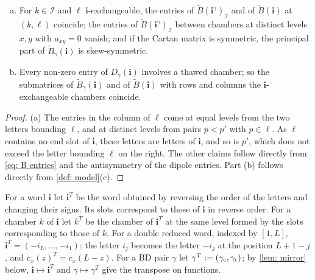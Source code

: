 \documentclass[a4paper]{amsart}
\numberwithin{equation}{section}
\theoremstyle{definition}
\theoremstyle{remark}
\newcommand{\mcI}{\mathcal{I}}
\newcommand{\bfi}{\mathbf{i}}
\newcommand{\tB}{\widetilde{B}}
\newcommand{\rr}{{\rm r}}
\newcommand{\cc}{{\rm c}}
\begin{document}
\begin{lemma}
  \label{lem: model local}
  \begin{enumerate}[(a)]
    \item For $k\in\mcI$ and $\ell$ $\bfi$-exchangeable, the entries of $\tB(\bfi^\gamma)_\mcI$ and of $\tB(\bfi)$ at $(k,\ell)$ coincide; the entries of $\tB(\bfi^\gamma)_\mcI$ between chambers at distinct levels $x,y$ with $a_{xy}=0$ vanish; and if the Cartan matrix is symmetric, the principal part of $\tB_\gamma(\bfi)$ is skew-symmetric.
    \item Every non-zero entry of $D_\gamma(\bfi)$ involves a thawed chamber; so the submatrices of $\tB_\gamma(\bfi)$ and of $\tB(\bfi)$ with rows and columns the $\bfi$-exchangeable chambers coincide.
  \end{enumerate}
\end{lemma}
\begin{proof}
  (a) The entries in the column of $\ell$ come at equal levels from the two letters bounding $\ell$, and at distinct levels from pairs $p<p'$ with $p\in\ell$.
  As $\ell$ contains no end slot of $\bfi$, these letters are letters of $\bfi$, and so is $p'$, which does not exceed the letter bounding $\ell$ on the right.
  The other claims follow directly from \eqref{eq: B entries} and the antisymmetry of the dipole entries.
  Part (b) follows directly from \cref{def: model}(c).
\end{proof}

For a word $\bfi$ let $\bfi^T$ be the word obtained by reversing the order of the letters and changing their signs.
Its slots correspond to those of $\bfi$ in reverse order.
For a chamber $k$ of $\bfi$ let $k^T$ be the chamber of $\bfi^T$ at the same level formed by the slots corresponding to those of $k$.
For a double reduced word, indexed by $[1,L]$, $\bfi^T=(-i_L,\dots,-i_1)$: the letter $i_j$ becomes the letter $-i_j$ at the position $L+1-j$, and $c_x(z)^T=c_x(L-z)$.
For a BD pair $\gamma$ let $\gamma^T:=(\gamma_{\cc},\gamma_{\rr})$; by \cref{lem: mirror} below, $\bfi\mapsto\bfi^T$ and $\gamma\mapsto\gamma^T$ give the transpose on functions.
\end{document}
